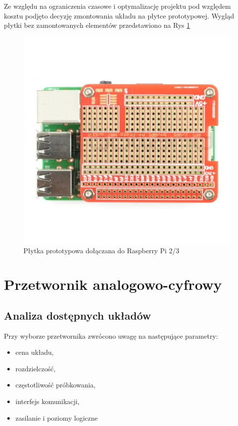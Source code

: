 Ze względu na ograniczenia czasowe i optymalizację projektu pod względem kosztu podjęto decyzję zmontowania układu na płytce prototypowej. Wygląd płytki bez zamontowanych elementów przedstawiono na Rys \ref{fig:rpihat}

\begin{figure}[H]
	\centering
		\includegraphics[width=12cm]{rpihat}
	\caption{Płytka prototypowa dołączana do Raspberry Pi 2/3} 
	\label{fig:rpihat}
\end{figure}


\section{Przetwornik analogowo-cyfrowy}

\subsection{Analiza dostępnych układów}
Przy wyborze przetwornika zwrócono uwagę na następujące parametry:
\begin{itemize}
\item cena układu, 
\item rozdzielczość, 
\item częstotliwość próbkowania,
\item interfejs komunikacji,
\item zasilanie i poziomy logiczne
\end{itemize}

